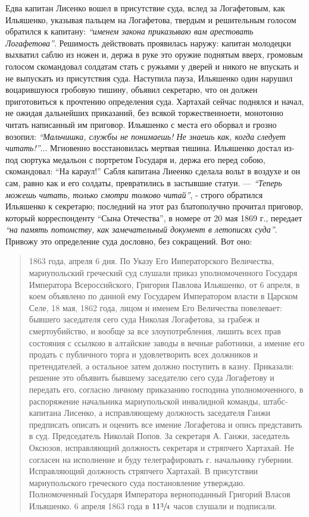 \documentclass[a4paper,20pt]{article}
\begin{document}
Едва капитан Лисенко вошел в присутствие суда,
вслед за Логафетовым, как Ильяшенко, указывая пальцем на 
Логафетова, твердым и решительным голосом
обратился к капитану: \emph{``именем закона приказываю вам
арестовать Логафетова''}. Решимость действовать проявилась
наружу: капитан молодецки выхватил саблю из ножен
и, держа в руке это оружие поднятым вверх, громовым
голосом скомандовал солдатам стать с ружьями у дверей
и никого не впускать и не выпускать из присутствия
суда. Наступила пауза, Ильяшенко один нарушил воцарившуюся 
гробовую тишину, объявил секретарю, что он
должен приготовиться к прочтению определения суда. Хартахай сейчас 
поднялся и начал, не ожидая дальнейших
приказаний, без всякой торжественноети, монотонно читать
написанный им приговор. Ильяшенко с места его оборвал 
и грозно возопил: \emph{``Мальчишка, службы не понимаешь!
Не знаешь как, когда следует читать!''}... Мгновенно восстановилась 
мертвая тишина. Ильяшенко достал из-под
сюртука медальон с портретом Государя и, держа его
перед собою, скомандовал: ``На караул!'' Сабля капитана
Лиеенко сделала вольт в воздухе и он сам, равно как
и его солдаты, превратились в застывшие статуи. — \emph{``Теперь
можешь читать, только смотри толково читай''}, - строго обратился
Ильяшенко к секретарю; последний на этот раз
блатополучно прочитал приговор, который корреспонденту
``Сына Отечества'', в номере от 20 мая 1869 г., передает \emph{``на память потомству, как замечательный документ
в летописях суда''}. Привожу это определение суда дословно, без сокращений. Вот оно:
\begin{quote}
\em\bfseries
	
1863 года, апреля 6 дня. По Указу Его Ииператорского Величества, мариупольский греческий суд слушали
приказ уполномоченного Государя Императора Всероссийского,
Григория Павлова Ильяшенко, от 6 апреля, в коем объявлено 
по данной ему Государем Императором власти в
Царском Селе, 18 мая, 1862 года, лицом и именем
Его Величества повелевает: бывшего заседателя сего суда
Николая Логафетова, за грабеж и смертоубийство, и вообще
за все злоупотребления, лишить всех прав состояния с
ссылкою в алтайские заводы в вечные работники, а имение
его продать с публичного торга и удовлетворить всех
должников и претендателей, а остальное затем должно
поступить в казну. Приказали: решение это объявить бывшему заседателю сего суда 
Логафетову и передать его, согласно личному приказанию господина уполномоченного, в
распоряжение начальника мариупольской инвалидной команды,
штабс-капитана Лисенко, а исправляющему должность заседателя Ганжи 
предписать описать и оценить все имение
Логафетова и опись представить в суд. Председатель Николай Попов. 
За секретаря А. Ганжи, заседатель Оксюзов,
исправляющий должность секретаря и стряпчего Хартахай.
Не согласен на исполнение и буду телеграфировать г. начальнику губернии. 
Исправляющий должность стряпчего Хартахай. В присутствии мариупольского греческого суда постановление 
утверждаю. Полномоченный Государя Императора
верноподанный Григорий Власов Ильяшенко. 6 апреля 1863
года в $11 \sfrac{3}{4}$ часов слушали и подписали.

\end{quote}
\end{document}
